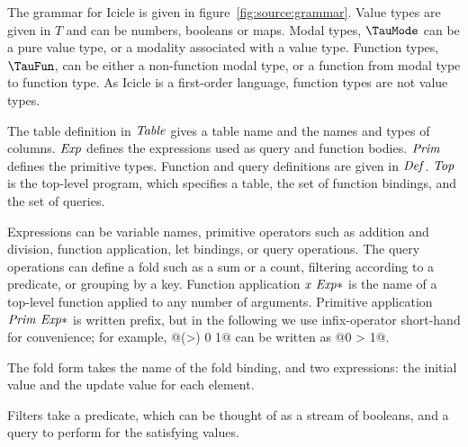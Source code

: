 



The grammar for Icicle is given in figure~\ref{fig:source:grammar}.
Value types are given in $T$ and can be numbers, booleans or maps.
Modal types, $\TauMode$ can be a pure value type, or a modality associated with a value type.
Function types, $\TauFun$, can be either a non-function modal type, or a function from modal type to function type.
As Icicle is a first-order language, function types are not value types.

The table definition in $\mathit{Table}$ gives a table name and the names and types of columns.
$\mathit{Exp}$ defines the expressions used as query and function bodies.
$\mathit{Prim}$ defines the primitive types.
Function and query definitions are given in $\mathit{Def}$.
$\mathit{Top}$ is the top-level program, which specifies a table, the set of function bindings, and the set of queries.

Expressions can be variable names, primitive operators such as addition and division, function application, let bindings, or query operations.
The query operations can define a fold such as a sum or a count, filtering according to a predicate, or grouping by a key.
Function application $\mathit{x~Exp*}$ is the name of a top-level function applied to any number of arguments.
Primitive application $\mathit{Prim~Exp*}$ is written prefix, but in the following we use infix-operator short-hand for convenience; for example, @(>) 0 1@ can be written as @0 > 1@.


The fold form takes the name of the fold binding, and two expressions: the initial value and the update value for each element.


Filters take a predicate, which can be thought of as a stream of booleans, and a query to perform for the satisfying values.


